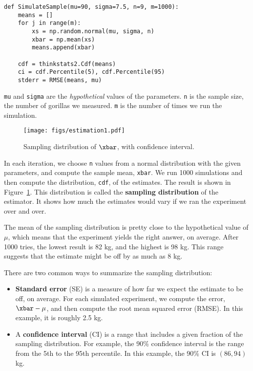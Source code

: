 \documentclass[12pt]{book}
\begin{document}
\begin{verbatim}
def SimulateSample(mu=90, sigma=7.5, n=9, m=1000):
    means = []
    for j in range(m):
        xs = np.random.normal(mu, sigma, n)
        xbar = np.mean(xs)
        means.append(xbar)

    cdf = thinkstats2.Cdf(means)
    ci = cdf.Percentile(5), cdf.Percentile(95)
    stderr = RMSE(means, mu)
\end{verbatim}

{\tt mu} and {\tt sigma} are the {\em hypothetical} values of
the parameters.  {\tt n} is the sample size, the number of
gorillas we measured.  {\tt m} is the number of times we run
the simulation.

\begin{figure}
\centerline{\texttt{[image: figs/estimation1.pdf]}}
\caption{Sampling distribution of $\xbar$, with confidence interval.}
\label{estimation1}
\end{figure}

In each iteration, we choose {\tt n} values from a normal
distribution with the given parameters, and compute the sample mean,
{\tt xbar}.  We run 1000 simulations and then compute the
distribution, {\tt cdf}, of the estimates.  The result is shown in
Figure~\ref{estimation1}.  This distribution is called the {\bf
  sampling distribution} of the estimator.  It shows how much the
estimates would vary if we ran the experiment over and over.

The mean of the sampling distribution is pretty close
to the hypothetical value of $\mu$, which means that the experiment
yields the right answer, on average.  After 1000 tries, the lowest
result is 82 kg, and the highest is 98 kg.  This range suggests that
the estimate might be off by as much as 8 kg.

There are two common ways to summarize the sampling distribution:

\begin{itemize}

\item {\bf Standard error} (SE) is a measure of how far we expect the
  estimate to be off, on average.  For each simulated experiment, we
  compute the error, $\xbar - \mu$, and then compute the root mean
  squared error (RMSE).  In this example, it is roughly 2.5 kg.

\item A {\bf confidence interval} (CI) is a range that includes a
  given fraction of the sampling distribution.  For example, the 90\%
  confidence interval is the range from the 5th to the 95th
  percentile.  In this example, the 90\% CI is $(86, 94)$ kg.

\end{itemize}
\end{document}
